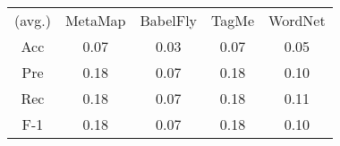 \begin{tabular}{ccccc}
(avg.) & MetaMap & BabelFly & TagMe & WordNet\\ 
Acc & 0.07 & 0.03 & 0.07 & 0.05\\ 
Pre & 0.18 & 0.07 & 0.18 & 0.10\\ 
Rec & 0.18 & 0.07 & 0.18 & 0.11\\ 
F-1 & 0.18 & 0.07 & 0.18 & 0.10\\ 

\end{tabular}